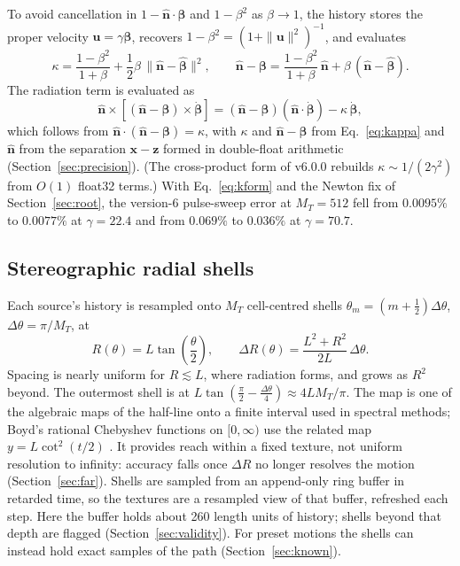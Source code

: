 \documentclass[11pt, a4paper]{article}
\begin{document}
To avoid cancellation in $1 - \hat{\mathbf{n}}\cdot\boldsymbol{\beta}$ and $1 - \beta^2$ as $\beta \to 1$, the history stores the proper velocity $\mathbf{u} = \gamma\boldsymbol{\beta}$, recovers $1 - \beta^2 = (1 + \|\mathbf{u}\|^2)^{-1}$, and evaluates
\begin{equation}
\kappa = \frac{1 - \beta^2}{1 + \beta} + \frac{1}{2}\beta\,\|\hat{\mathbf{n}} - \hat{\boldsymbol{\beta}}\|^2, \qquad \hat{\mathbf{n}} - \boldsymbol{\beta} = \frac{1 - \beta^2}{1 + \beta}\,\hat{\mathbf{n}} + \beta\,(\hat{\mathbf{n}} - \hat{\boldsymbol{\beta}}).
\label{eq:kappa}
\end{equation}
The radiation term is evaluated as
\begin{equation}
\hat{\mathbf{n}} \times \left[(\hat{\mathbf{n}} - \boldsymbol{\beta}) \times \dot{\boldsymbol{\beta}}\right] = (\hat{\mathbf{n}} - \boldsymbol{\beta})(\hat{\mathbf{n}}\cdot\dot{\boldsymbol{\beta}}) - \kappa\,\dot{\boldsymbol{\beta}},
\label{eq:kform}
\end{equation}
which follows from $\hat{\mathbf{n}}\cdot(\hat{\mathbf{n}} - \boldsymbol{\beta}) = \kappa$, with $\kappa$ and $\hat{\mathbf{n}} - \boldsymbol{\beta}$ from Eq.~\eqref{eq:kappa} and $\hat{\mathbf{n}}$ from the separation $\mathbf{x} - \mathbf{z}$ formed in double-float arithmetic (Section~\ref{sec:precision}). (The cross-product form of v6.0.0 rebuilds $\kappa \sim 1/(2\gamma^2)$ from $O(1)$ float32 terms.) With Eq.~\eqref{eq:kform} and the Newton fix of Section~\ref{sec:root}, the version-6 pulse-sweep error at $M_T = 512$ fell from $0.0095\%$ to $0.0077\%$ at $\gamma = 22.4$ and from $0.069\%$ to $0.036\%$ at $\gamma = 70.7$.

\subsection{Stereographic radial shells}
Each source's history is resampled onto $M_T$ cell-centred shells $\theta_m = (m + \tfrac12)\Delta\theta$, $\Delta\theta = \pi/M_T$, at
\begin{equation}
R(\theta) = L\tan\!\left(\frac{\theta}{2}\right), \qquad \Delta R(\theta) = \frac{L^2 + R^2}{2L}\,\Delta\theta.
\label{eq:stereo}
\end{equation}
Spacing is nearly uniform for $R \lesssim L$, where radiation forms, and grows as $R^2$ beyond. The outermost shell is at $L\tan(\tfrac{\pi}{2} - \tfrac{\Delta\theta}{4}) \approx 4LM_T/\pi$. The map is one of the algebraic maps of the half-line onto a finite interval used in spectral methods; Boyd's rational Chebyshev functions on $[0, \infty)$ use the related map $y = L\cot^2(t/2)$ \cite{boyd1987}. It provides reach within a fixed texture, not uniform resolution to infinity: accuracy falls once $\Delta R$ no longer resolves the motion (Section~\ref{sec:far}). Shells are sampled from an append-only ring buffer in retarded time, so the textures are a resampled view of that buffer, refreshed each step. Here the buffer holds about 260 length units of history; shells beyond that depth are flagged (Section~\ref{sec:validity}). For preset motions the shells can instead hold exact samples of the path (Section~\ref{sec:known}).
\end{document}
